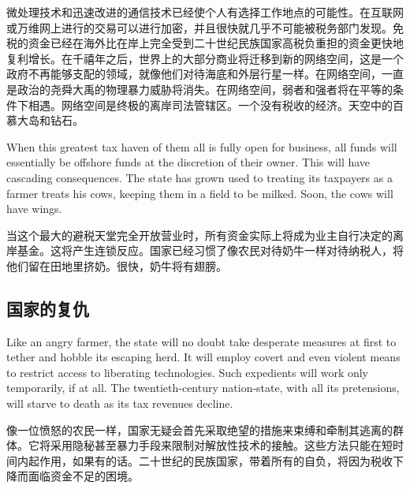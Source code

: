 \begin{Parallel}{97mm}{45mm}
  \ParallelRText
  {\small 微处理技术和迅速改进的通信技术已经使个人有选择工作地点的可能性。在互联网或万维网上进行的交易可以进行加密，并且很快就几乎不可能被税务部门发现。免税的资金已经在海外比在岸上完全受到二十世纪民族国家高税负重担的资金更快地复利增长。在千禧年之后，世界上的大部分商业将迁移到新的网络空间，这是一个政府不再能够支配的领域，就像他们对待海底和外层行星一样。在网络空间，一直是政治的尧舜大禹的物理暴力威胁将消失。在网络空间，弱者和强者将在平等的条件下相遇。网络空间是终极的离岸司法管辖区。一个没有税收的经济。天空中的百慕大岛和钻石。}


  \ParallelPar  

  \ParallelLText
  {When this greatest tax haven of them all is fully open for business, all funds will essentially be offshore funds at the discretion of their owner. This will have cascading consequences. The state has grown used to treating its taxpayers as a farmer treats his cows, keeping them in a field to be milked. Soon, the cows will have wings.  }
  
  \ParallelRText
  {\small 当这个最大的避税天堂完全开放营业时，所有资金实际上将成为业主自行决定的离岸基金。这将产生连锁反应。国家已经习惯了像农民对待奶牛一样对待纳税人，将他们留在田地里挤奶。很快，奶牛将有翅膀。}
  \ParallelPar

\subsection{国家的复仇}
 
  \ParallelLText
  { Like an angry farmer, the state will no doubt take desperate measures at first to tether and hobble its escaping herd. It will employ covert and even violent means to restrict access to liberating technologies. Such expedients will work only temporarily, if at all. The twentieth-century nation-state, with all its pretensions, will starve to death as its tax revenues decline.  }
  
  \ParallelRText
  {\small 像一位愤怒的农民一样，国家无疑会首先采取绝望的措施来束缚和牵制其逃离的群体。它将采用隐秘甚至暴力手段来限制对解放性技术的接触。这些方法只能在短时间内起作用，如果有的话。二十世纪的民族国家，带着所有的自负，将因为税收下降而面临资金不足的困境。 }


  \ParallelPar  


\end{Parallel}
